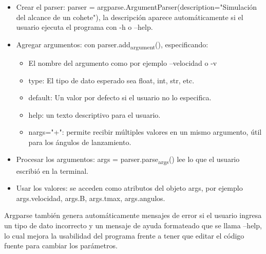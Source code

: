 \documentclass{article}
\begin{document}
\begin{itemize}
\item Crear el parser: parser = argparse.ArgumentParser(description="Simulación del alcance de un cohete"), la descripción aparece automáticamente si el usuario ejecuta el programa con -h o --help.
\item Agregar argumentos: con parser.add\textsubscript{argument}(), especificando:
\begin{itemize}
\item El nombre del argumento como por ejemplo --velocidad o -v
\item type: El tipo de dato esperado sea float, int, str, etc.
\item default: Un valor por defecto si el usuario no lo especifica.
\item help: un texto descriptivo para el usuario.
\item nargs="+": permite recibir múltiples valores en un mismo argumento, útil para los ángulos de lanzamiento.
\end{itemize}

\item Procesar los argumentos: args = parser.parse\textsubscript{args}() lee lo que el usuario escribió en la terminal.
\item Usar los valores: se acceden como atributos del objeto args, por ejemplo args.velocidad, args.B, args.tmax, args.angulos.
\end{itemize}

Argparse también genera automáticamente mensajes de error si el usuario ingresa un tipo de dato incorrecto y un mensaje de ayuda formateado que se llama --help,
lo cual mejora la usabilidad del programa frente a tener que editar el código fuente para cambiar los parámetros.
\end{document}
